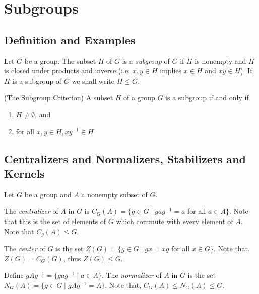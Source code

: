 \documentclass[../main]{subfiles}
\begin{document}
 
 \section{Subgroups}
 
 \subsection{Definition and Examples}
 
 
 \begin{dfn}
  Let $G$ be a group. The subset $H$ of $G$ is a \textit{subgroup} of $G$ if $H$ is nonempty and $H$ is closed under products and inverse (i.e, $x,y\in H$ implies $x\in H$ and $xy\in H$). If $H$ is a subgroup of $G$ we shall write $H\leq G$.
 \end{dfn}

 
 \begin{prop}
  (The Subgroup Criterion) A subset $H$ of a group $G$ is a subgroup if and only if 
  \begin{enumerate}
   \item $H\neq \emptyset$, and 
   \item for all $x,y \in H, xy^{-1}\in H$
  \end{enumerate}
 \end{prop}
 
 
 \subsection{Centralizers and Normalizers, Stabilizers and Kernels}
 
 
 Let $G$ be a group and $A$ a nonempty subset of $G$.
 
 
 \begin{dfn}
  The \textit{centralizer} of $A$ in $G$ is $C_G(A)=\{g\in G \mid gag^{-1}=a $ for all $a\in A\}$. Note that this is the set of elements of $G$ which commute with every element of $A$. Note that $C_g(A) \leq G$.
 \end{dfn}
 
 
 \begin{dfn}
  The \textit{center} of $G$ is the set $Z(G)=\{g\in G\mid gx=xg$ for all $x\in G\}$. Note that, $Z(G)=C_G(G)$, thus $Z(G)\leq G$.
 \end{dfn}


 \begin{dfn}
  Define $gAg^{-1}=\{gag^{-1} \mid a\in A\}$. The \textit{normalizer} of $A$ in $G$ is the set $N_G(A)=\{g\in G \mid gAg^{-1}=A\}$. Note that, $C_G(A)\leq N_G(A)\leq G$.
 \end{dfn}
\end{document}
